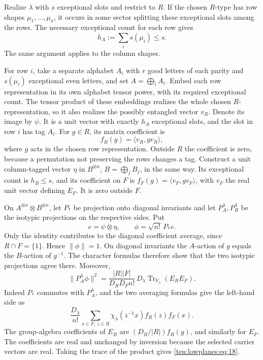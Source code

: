 Realize \(\lambda\) with \(s\) exceptional slots and restrict to \(R\).
If the chosen \(R\)-type has row shapes \(\mu_1,\ldots,\mu_a\), it occurs
in some sector splitting these exceptional slots among the rows.
The necessary exceptional count for each row gives
\begin{equation}
 h_A:=\sum_i s(\mu_i)\le s.
 \label{ten:lowplanes:eq:17}
\end{equation}
The same argument applies to the column shapes.

For row \(i\), take a separate alphabet \(A_i\) with \(r\) good letters
of each parity and \(s(\mu_i)\) exceptional even letters, and set
\(A=\bigoplus_i A_i\).  Embed each row representation in its own
alphabet tensor power, with its required exceptional count.  The
tensor product of these embeddings realizes the whole chosen
\(R\)-representation, so it also realizes the possibly entangled vector
\(v_R\).  Denote its image by \(\psi\).  It is a unit vector with exactly
\(h_A\) exceptional slots, and the slot in row \(i\) has tag \(A_i\).
For \(g\in R\), its matrix coefficient is
\[
 f_R(g)=\langle v_R,g v_R\rangle,
\]
where \(g\) acts in the chosen row representation. Outside \(R\) the
coefficient is zero, because a permutation not preserving the rows
changes a tag.  Construct a unit column-tagged vector \(\eta\) in
\(B^{\otimes n}\), \(B=\bigoplus_j B_j\), in the same way.  Its
exceptional count is \(h_B\le s\), and its coefficient on \(F\) is
\(f_F(g)=\langle v_F,g v_F\rangle\), with \(v_F\) the real unit vector
defining \(E_F\). It is zero outside \(F\).

On \(A^{\otimes n}\otimes B^{\otimes n}\), let \(P_*\) be projection
onto diagonal invariants and let \(P_A^\lambda,P_B^\lambda\) be the
isotypic projections on the respective sides.  Put
\[
 e=\psi\otimes\eta,\qquad \phi=\sqrt{n!}\,P_*e.
\]
Only the identity contributes to the diagonal coefficient average,
since \(R\cap F=\{1\}\).  Hence \(\|\phi\|=1\).
On diagonal invariants the \(A\)-action of \(g\) equals the
\(B\)-action of \(g^{-1}\). The character formulas therefore show that
the two isotypic projections agree there.
Moreover,
\begin{equation}
 \|P_A^\lambda\phi\|^2
 =\frac{|R||F|}{D_RD_Fn!}\,
   D_\lambda\operatorname{Tr}_{V_\lambda}(E_RE_F).
 \label{ten:lowplanes:eq:18}
\end{equation}
Indeed \(P_*\) commutes with \(P_A^\lambda\), and the two averaging
formulas give the left-hand side as
\[
 \frac{D_\lambda}{n!}
 \sum_{x\in F,\ z\in R}
 \chi_\lambda(z^{-1}x)f_R(z)f_F(x).
\]
The group-algebra coefficients of \(E_R\) are
\((D_R/|R|)f_R(g)\), and similarly for \(E_F\).  The coefficients are
real and unchanged by inversion because the selected carrier vectors
are real.  Taking the trace of the product gives
\eqref{ten:lowplanes:eq:18}.

